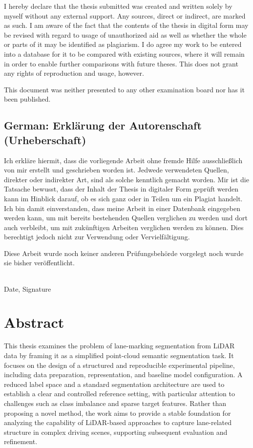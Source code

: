 \documentclass[a4paper,11pt,oneside]{article}
\begin{document}
I hereby declare that the thesis submitted was created and written
solely by myself without any external support. Any sources, direct
or indirect, are marked as such. I am aware of the fact that the
contents of the thesis in digital form may be revised with regard to
usage of unauthorized aid as well as whether the whole or parts of
it may be identified as plagiarism. I do agree my work to be entered
into a database for it to be compared with existing sources, where
it will remain in order to enable further comparisons with future
theses. This does not grant any rights of reproduction and usage,
however.

This document was neither presented to any other examination board
nor has it been published.

\subsection*{German: Erklärung der Autorenschaft (Urheberschaft)}

Ich erkläre hiermit, dass die vorliegende Arbeit ohne fremde Hilfe
ausschließlich von mir erstellt und geschrieben worden ist. Jedwede
verwendeten Quellen, direkter oder indirekter Art, sind als solche
kenntlich gemacht worden. Mir ist die Tatsache bewusst, dass der
Inhalt der Thesis in digitaler Form geprüft werden kann im Hinblick
darauf, ob es sich ganz oder in Teilen um ein Plagiat handelt. Ich
bin damit einverstanden, dass meine Arbeit in einer Datenbank
eingegeben werden kann, um mit bereits bestehenden Quellen
verglichen zu werden und dort auch verbleibt, um mit zukünftigen
Arbeiten verglichen werden zu können. Dies berechtigt jedoch nicht
zur Verwendung oder Vervielfältigung.

Diese Arbeit wurde noch keiner anderen Prüfungsbehörde vorgelegt
noch wurde sie bisher veröffentlicht.

\vspace{20mm}

\dotfill\\
Date, Signature

\newpage

\section*{Abstract}

This thesis examines the problem of lane-marking segmentation from LiDAR data by framing it as a simplified point-cloud semantic segmentation task. It focuses on the design of a structured and reproducible experimental pipeline, including data preparation, representation, and baseline model configuration. A reduced label space and a standard segmentation architecture are used to establish a clear and controlled reference setting, with particular attention to challenges such as class imbalance and sparse target features. Rather than proposing a novel method, the work aims to provide a stable foundation for analyzing the capability of LiDAR-based approaches to capture lane-related structure in complex driving scenes, supporting subsequent evaluation and refinement.
\newpage
\end{document}
